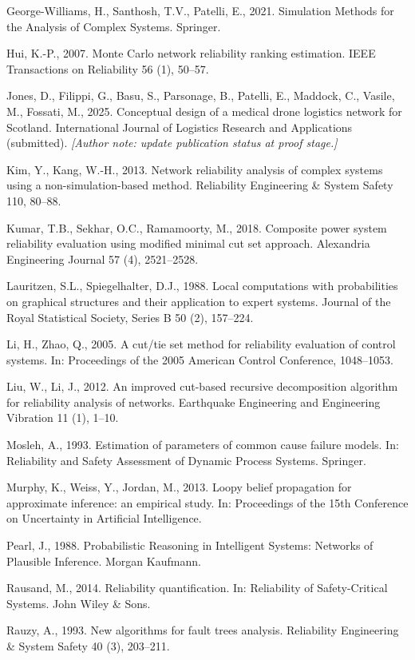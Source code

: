 \documentclass[preprint,12pt]{elsarticle}
\theoremstyle{definition}
\begin{document}
George-Williams, H., Santhosh, T.V., Patelli, E., 2021. Simulation Methods for the Analysis of Complex
Systems. Springer.

Hui, K.-P., 2007. Monte Carlo network reliability ranking estimation. IEEE Transactions on Reliability
56 (1), 50--57.

Jones, D., Filippi, G., Basu, S., Parsonage, B., Patelli, E., Maddock, C., Vasile, M., Fossati, M.,
2025. Conceptual design of a medical drone logistics network for Scotland. International Journal of
Logistics Research and Applications (submitted). \emph{[Author note: update publication status at
proof stage.]}

Kim, Y., Kang, W.-H., 2013. Network reliability analysis of complex systems using a
non-simulation-based method. Reliability Engineering \& System Safety 110, 80--88.

Kumar, T.B., Sekhar, O.C., Ramamoorty, M., 2018. Composite power system reliability evaluation using
modified minimal cut set approach. Alexandria Engineering Journal 57 (4), 2521--2528.

Lauritzen, S.L., Spiegelhalter, D.J., 1988. Local computations with probabilities on graphical
structures and their application to expert systems. Journal of the Royal Statistical Society, Series B
50 (2), 157--224.

Li, H., Zhao, Q., 2005. A cut/tie set method for reliability evaluation of control systems. In:
Proceedings of the 2005 American Control Conference, 1048--1053.

Liu, W., Li, J., 2012. An improved cut-based recursive decomposition algorithm for reliability analysis
of networks. Earthquake Engineering and Engineering Vibration 11 (1), 1--10.

Mosleh, A., 1993. Estimation of parameters of common cause failure models. In: Reliability and Safety
Assessment of Dynamic Process Systems. Springer.

Murphy, K., Weiss, Y., Jordan, M., 2013. Loopy belief propagation for approximate inference: an
empirical study. In: Proceedings of the 15th Conference on Uncertainty in Artificial Intelligence.

Pearl, J., 1988. Probabilistic Reasoning in Intelligent Systems: Networks of Plausible Inference.
Morgan Kaufmann.

Rausand, M., 2014. Reliability quantification. In: Reliability of Safety-Critical Systems. John Wiley
\& Sons.

Rauzy, A., 1993. New algorithms for fault trees analysis. Reliability Engineering \& System Safety 40
(3), 203--211.
\end{document}

